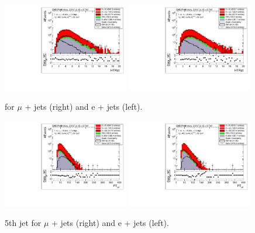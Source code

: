 \begin{figure}[!ht]
    \includegraphics[width=0.49\textwidth]{images/Run1/HTRat_StackLogY_Mu.pdf}
    \includegraphics[width=0.49\textwidth]{images/Run1/HTRat_StackLogY_e.pdf}
    \caption{\HTrat for $\mu$ + jets (right) and e + jets (left).}
    \label{fig:HTrat}
\end{figure}

\begin{figure}[!ht]
    \includegraphics[width=0.49\textwidth]{images/Run1/5thJetPt_StackLogY_Mu.pdf}
    \includegraphics[width=0.49\textwidth]{images/Run1/5thJetPt_StackLogY_e.pdf}
    \caption{5th jet \pt for $\mu$ + jets (right) and e + jets (left).}
    \label{fig:5thjetpt}
\end{figure}

